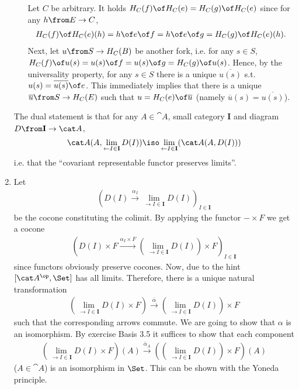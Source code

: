 \begin{answer}
\begin{enumerate}
\begin{itemize}
      Let $C$ be arbitrary. It holds $H_C(f)\of H_C(e)=H_C(g)\of H_C(e)$ since for any $h\from E\to C$, 
      \begin{align*}
        H_C(f)\of H_C(e)(h)=h\of e\of f=h\of e\of g=H_C(g)\of H_C(e)(h).
      \end{align*}
      Next, let $u\from S\to H_C(B)$ be another fork, i.e. for any $s\in S$, $H_C(f)\of u (s)=u(s)\of f=u(s)\of g=H_C(g)\of u(s)$. Hence, by the universality property, for any $s\in S$ there is a unique $\overline{u(s)}$ s.t. $u(s)=\overline{u(s)}\of e$. This immediately implies that there is a unique $\overline u\from S\to H_C(E)$ such that $u=H_C(e)\of \overline u$ (namely $\overline u(s)=\overline{u(s)}$).
    \end{itemize}
    The dual statement is that for any $A\in\cat A$, small category $\mathbf I$ and diagram $D\from \mathbf I\to\cat A$,
    $$\cat A(A,\lim_{\leftarrow I\in\mathbf I} D(I))\iso \lim_{\leftarrow I\in\mathbf I}(\cat A(A, D(I)))$$
    i.e. that the ``covariant representable functor preserves limits''.
  \item Let
    \begin{align*}
      (D(I)\xrightarrow{\alpha_I} \lim_{\to I\in\mathbf I} D(I))_{I\in\mathbf I}
    \end{align*}
    be the cocone constituting the colimit. By applying the functor $-\times F$ we get a cocone 
    \begin{align*}
      (D(I)\times F\xrightarrow{\alpha_I\times F} (\lim_{\to I\in\mathbf I} D(I))\times F)_{I\in\mathbf I}
    \end{align*} 
    since functors obviously preserve cocones. Now, due to the hint $[\cat A^\op,\Set]$ has all limits. Therefore, there is a unique natural transformation 
    \begin{align*}
      (\lim_{\to I\in\mathbf I} D(I)\times F)\xrightarrow{\overline\alpha} (\lim_{\to I\in\mathbf I} D(I))\times F
    \end{align*}
    such that the corresponding arrows commute. We are going to show that $\alpha$ is an isomorphism. By exercise Basis 3.5 it suffices to show that each component
    \begin{align*}
      (\lim_{\to I\in\mathbf I} D(I)\times F)(A)\xrightarrow{\overline\alpha_A} ((\lim_{\to I\in\mathbf I} D(I))\times F)(A)
    \end{align*}
 ($A\in\cat A$) is an isomorphism in $\Set$. 
    This can be shown with the Yoneda principle.


\end{enumerate}
\end{answer}
